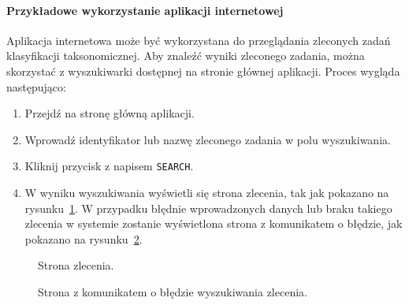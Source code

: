             \paragraph{Przykładowe wykorzystanie aplikacji internetowej}

                Aplikacja internetowa może być wykorzystana do przeglądania zleconych zadań klasyfikacji taksonomicznej. Aby znaleźć wyniki zleconego zadania, można skorzystać z wyszukiwarki dostępnej na stronie głównej aplikacji. Proces wygląda następująco:

                \begin{enumerate}
                    \item {
                        Przejdź na stronę główną aplikacji.
                    }
                    \item {
                        Wprowadź identyfikator lub nazwę zleconego zadania w polu wyszukiwania.
                    }
                    \item {
                        Kliknij przycisk z napisem \texttt{SEARCH}.
                    }
                    \item {
                        W wyniku wyszukiwania wyświetli się strona zlecenia, tak jak pokazano na rysunku~\ref{Picture:App:WebSearchSuccess}. W przypadku błędnie wprowadzonych danych lub braku takiego zlecenia w systemie zostanie wyświetlona strona z komunikatem o błędzie, jak pokazano na rysunku~\ref{Picture:App:WebSearchFailure}.
                    }
                \end{enumerate}

                \begin{figure}
                    \begin{center}
                        
                    \end{center}
                    \caption{
                        Strona zlecenia.
                    }\label{Picture:App:WebSearchSuccess}
                \end{figure}

                \begin{figure}
                    \begin{center}
                        
                    \end{center}
                    \caption{
                        Strona z komunikatem o błędzie wyszukiwania zlecenia.
                    }\label{Picture:App:WebSearchFailure}
                \end{figure}

